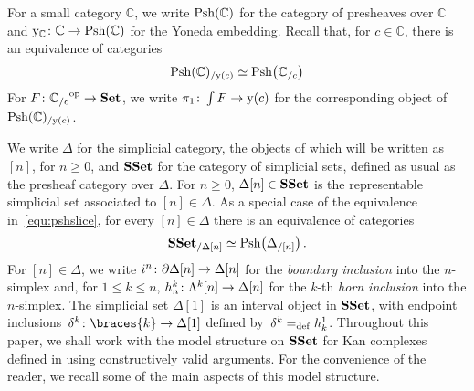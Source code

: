 \documentclass[reqno,10pt,a4paper,oneside,draft]{amsart}
\begin{document}
\medskip
For a small category $\mathbb{C}$, we write $\mathrm{Psh}(\mathbb{C})$ for the category of presheaves over $\mathbb{C}$ and $\mathrm{y}_\mathbb{C} \colon \mathbb{C} \to \mathrm{Psh}(\mathbb{C})$ for the Yoneda embedding. 
Recall that, for $c \in \mathbb{C}$, there is an equivalence of categories
\begin{equation}
\label{equ:pshslice}
\mathrm{Psh}(\mathbb{C})_{/ \mathrm{y}(c)} \simeq \mathrm{Psh} \big(  \mathbb{C}_{/c}  \big )
\end{equation}
For $F \colon {\mathbb{C}_{/c}}^{\operatorname{op}} \to \mathbf{Set}$, we write $\pi_1 \colon \int F \to \mathrm{y}(c)$
for the corresponding object of~$\mathrm{Psh}(\mathbb{C})_{/ \mathrm{y}(c)}$.


\medskip



\medskip




We write $\Delta$ for the simplicial category, the objects of which will be written as $[n]$, for $n \geq 0$,
and $\mathbf{SSet}$ for the category of simplicial sets, defined as usual as the  presheaf category over $\Delta$.
For $n \geq 0$, $\Delta[n] \in \mathbf{SSet}$ is the representable simplicial set associated to $[n] \in \Delta$. As a special case of the equivalence in~\eqref{equ:pshslice}, for every $[n] \in \Delta$ there is an equivalence of categories
\begin{equation}
\label{equ:psh-slice-sset}
\mathbf{SSet}_{/\Delta[n]} \simeq \mathrm{Psh} \big( \Delta_{/[n]} \big ) \, .
\end{equation}
For $[n] \in \Delta$, we write $i^n \colon  \partial \Delta[n] \to \Delta[n]$ 
for the \emph{boundary inclusion} into the $n$-simplex and, for $1 \leq k \leq n$,  
$h^k_n  \colon \Lambda^k[n] \to \Delta[n]$ 
for the $k$-th \emph{horn inclusion} into the $n$-simplex. 
The simplicial set $\Delta[1]$ is an interval object in $\mathbf{SSet}$, with endpoint inclusions~$\kcyl \co \braces{ k} \to \Delta[1]$ defined by~$\delta^k =_{\operatorname{def}} h^1_k$. Throughout this paper, we shall work  with the model structure on $\mathbf{SSet}$ for Kan complexes defined in \cite[Section~5]{henry2018wms} using constructively valid arguments. For the convenience of the reader, we recall some
of the main aspects of this model structure.


\medskip
\end{document}

